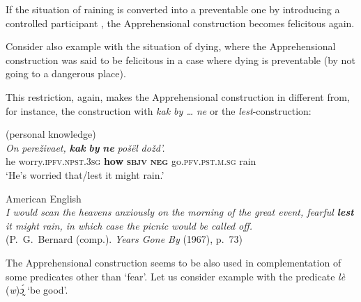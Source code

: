 \documentclass[output=paper,colorlinks,citecolor=brown]{langscibook}
\begin{document}
 If the situation of raining is converted into a preventable one by introducing a controlled participant , the Apprehensional construction becomes felicitous again.

\z

 Consider also example  with the situation of dying, where the Apprehensional construction was said to be felicitous in a case where dying is preventable (by not going to a dangerous place).

This restriction, again, makes the Apprehensional construction in  different from, for instance, the  construction with \textit{kak by {\dots} ne} or the  \textit{lest}-construction:

\ea \label{ex:Fed50} \textnormal{ (personal knowledge)} \\
\gll \textit{On} \textit{pereživaet,} \textit{\textbf{kak}} \textit{\textbf{by}} \textit{\textbf{ne}} \textit{pošël} \textit{dožd'.} \\
he worry.\textsc{ipfv.npst.3sg} \textbf{how} \textsc{\textbf{sbjv}} \textsc{\textbf{neg}} go.\textsc{pfv.pst.m.sg} rain \\
\glt `He's worried that\slash lest it might rain.'
\z


\ea \label{ex:Fed51} \textnormal{American English} \\
\textit{I would scan the heavens anxiously on the morning of the great event, fearful \textbf{lest} it might rain, in which case the picnic would be called off.} \\
\textup{(P.\ G.\ Bernard (comp.). \textit{Years Gone By} (1967), p.\ 73)}
\z


 The Apprehensional construction seems to be also used in complementation of some predicates other than `fear'. Let us consider example  with the predicate \textit{lè }(\textit{w})\textit{ɔ̰́} `be good'.
\end{document}
